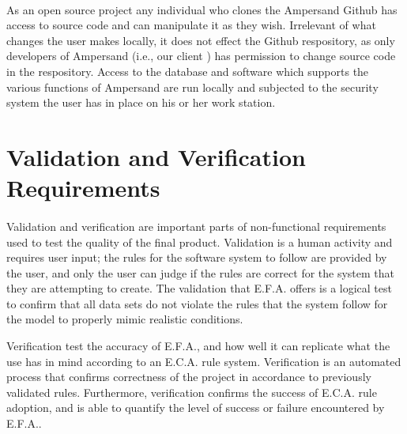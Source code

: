 \documentclass[12pt]{report}
\begin{document}
\paragraph*{}
As an open source project any individual who clones the Ampersand Github has access to source code 
and can manipulate it as they wish. Irrelevant of what changes the user makes locally, it does not 
effect the Github respository, as only developers of Ampersand \big(i.e., our client \big) has 
permission to change source code in the respository. Access to the database and software which 
supports the various functions of Ampersand are run locally and subjected to the security system 
the user has in place on his or her work station.

\section{Validation and Verification Requirements}\label{sec:Verification}

\paragraph*{}
Validation and verification are important parts of non-functional requirements used to test the 
quality of the final product. Validation is a human activity and requires user input; the rules for 
the software system to follow are provided by the user, and only the user can judge if the rules 
are correct for the system that they are attempting to create. The validation that E.F.A. offers is 
a logical test to confirm that all data sets do not violate the rules that the system follow for 
the model to properly mimic realistic conditions. 

Verification test the accuracy of E.F.A., and how well it can replicate what the use has in mind 
according to an E.C.A. rule system. Verification is an automated process that confirms correctness 
of the project in accordance to previously validated rules. Furthermore, verification confirms the 
success of E.C.A. rule adoption, and is able to quantify the level of success or failure 
encountered by E.F.A.. 
\end{document}

